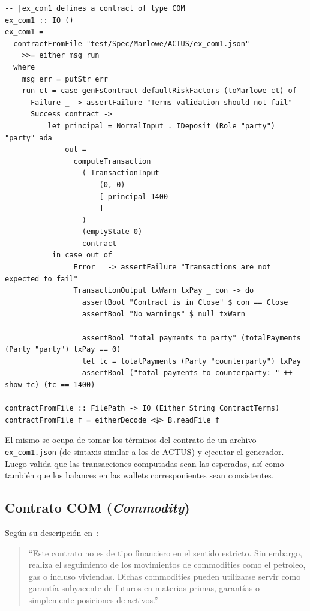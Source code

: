 \documentclass[12pt]{book}
\begin{document}
\begin{lstlisting}[style=Haskell-cardano, caption=Test de ejemplo escrito durante el desarrollo de la tesis para el contrato COM.]
-- |ex_com1 defines a contract of type COM
ex_com1 :: IO ()
ex_com1 =
  contractFromFile "test/Spec/Marlowe/ACTUS/ex_com1.json"
    >>= either msg run
  where
    msg err = putStr err
    run ct = case genFsContract defaultRiskFactors (toMarlowe ct) of
      Failure _ -> assertFailure "Terms validation should not fail"
      Success contract ->
          let principal = NormalInput . IDeposit (Role "party") "party" ada
              out =
                computeTransaction
                  ( TransactionInput
                      (0, 0)
                      [ principal 1400
                      ]
                  )
                  (emptyState 0)
                  contract
           in case out of
                Error _ -> assertFailure "Transactions are not expected to fail"
                TransactionOutput txWarn txPay _ con -> do
                  assertBool "Contract is in Close" $ con == Close
                  assertBool "No warnings" $ null txWarn

                  assertBool "total payments to party" (totalPayments (Party "party") txPay == 0)
                  let tc = totalPayments (Party "counterparty") txPay
                  assertBool ("total payments to counterparty: " ++ show tc) (tc == 1400)

contractFromFile :: FilePath -> IO (Either String ContractTerms)
contractFromFile f = eitherDecode <$> B.readFile f
\end{lstlisting}

El mismo se ocupa de tomar los términos del contrato de un archivo \texttt{ex\_com1.json} (de sintaxis similar a los de ACTUS) y ejecutar el generador. Luego valida que las transacciones computadas sean las esperadas, así como también que los balances en las wallets corresponientes sean consistentes.

\subsection{Contrato COM (\textit{Commodity})}\label{ssec:contrato_com}

Según su descripción en~\cite{ACTUS_Dictionary}:

\begin{quote} 
``Este contrato no es de tipo financiero en el sentido estricto. Sin embargo, realiza el seguimiento de los movimientos de commodities como el petroleo, gas o incluso viviendas. Dichas commodities pueden utilizarse servir como garantía subyacente de futuros en materias primas, garantías o simplemente posiciones de activos.''
\end{quote}
\end{document}
